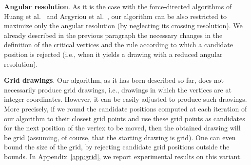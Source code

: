 \documentclass[runningheads]{llncs}
\newcommand{\myparagraph}[1]{\smallskip\noindent\textbf{#1}.}
\begin{document}
\myparagraph{Angular resolution}
%
As it is the case with the force-directed algorithms of Huang et al.~\cite{DBLP:journals/vlc/HuangEHL13} and Argyriou et al.~\cite{DBLP:journals/cj/ArgyriouBS13}, our algorithm can be also restricted to maximize only the angular resolution (by neglecting its crossing resolution). We already described in the previous paragraph the necessary changes in the definition of the critical vertices and the rule according to which a candidate position is rejected (i.e., when it yields a drawing with a reduced angular resolution).

\myparagraph{Grid drawings}
%
Our algorithm, as it has been described so far, does not necessarily produce grid drawings, i.e., drawings in which the vertices are at integer coordinates. However, it can be easily adjusted to produce such drawings. More precisely, if we round the candidate positions computed at each iteration of our algorithm to their closest grid points and use these grid points as candidates for the next position of the vertex to be moved, then the obtained drawing will be grid (assuming, of course, that the starting drawing is grid). One can even bound the size of the grid, by rejecting candidate grid positions outside the bounds. In Appendix~\ref{app:grid}, we report experimental results on this variant.

\end{document}
